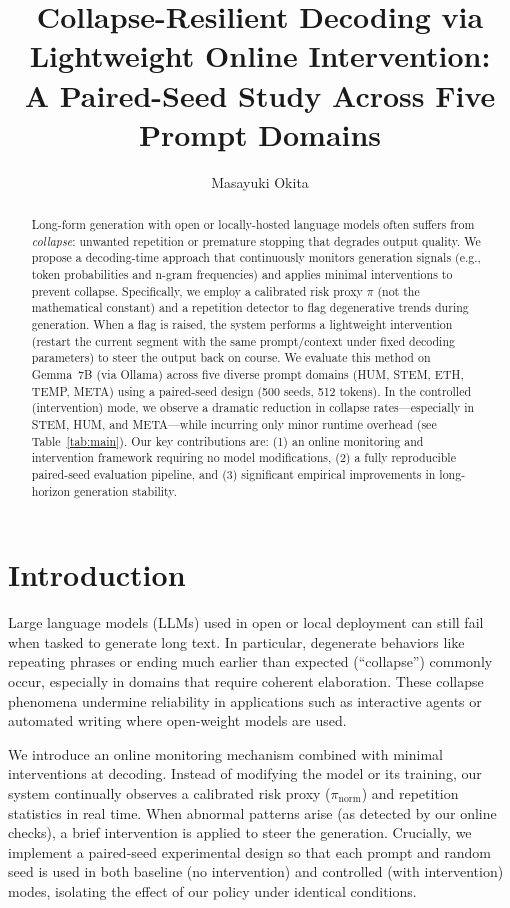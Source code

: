 \documentclass{article}
\begin{document}
\title{Collapse-Resilient Decoding via Lightweight Online Intervention:\\A Paired-Seed Study Across Five Prompt Domains}
\author{Masayuki Okita}
\date{}
\maketitle

\begin{abstract}
Long-form generation with open or locally-hosted language models often suffers from \emph{collapse}: unwanted repetition or premature stopping that degrades output quality. We propose a decoding-time approach that continuously monitors generation signals (e.g., token probabilities and n-gram frequencies) and applies minimal interventions to prevent collapse. Specifically, we employ a calibrated risk proxy $\pi$ (not the mathematical constant) and a repetition detector to flag degenerative trends during generation. When a flag is raised, the system performs a lightweight intervention (restart the current segment with the same prompt/context under fixed decoding parameters) to steer the output back on course. We evaluate this method on Gemma~7B (via Ollama) across five diverse prompt domains (HUM, STEM, ETH, TEMP, META) using a paired-seed design (500 seeds, 512 tokens). In the controlled (intervention) mode, we observe a dramatic reduction in collapse rates---especially in STEM, HUM, and META---while incurring only minor runtime overhead (see Table~\ref{tab:main}). Our key contributions are: (1) an online monitoring and intervention framework requiring no model modifications, (2) a fully reproducible paired-seed evaluation pipeline, and (3) significant empirical improvements in long-horizon generation stability.
\end{abstract}

\section{Introduction}
Large language models (LLMs) used in open or local deployment can still fail when tasked to generate long text. In particular, degenerate behaviors like repeating phrases or ending much earlier than expected (``collapse'') commonly occur, especially in domains that require coherent elaboration. These collapse phenomena undermine reliability in applications such as interactive agents or automated writing where open-weight models are used.

We introduce an online monitoring mechanism combined with minimal interventions at decoding. Instead of modifying the model or its training, our system continually observes a calibrated risk proxy ($\pi_{\text{norm}}$) and repetition statistics in real time. When abnormal patterns arise (as detected by our online checks), a brief intervention is applied to steer the generation. Crucially, we implement a paired-seed experimental design so that each prompt and random seed is used in both baseline (no intervention) and controlled (with intervention) modes, isolating the effect of our policy under identical conditions.
\end{document}
